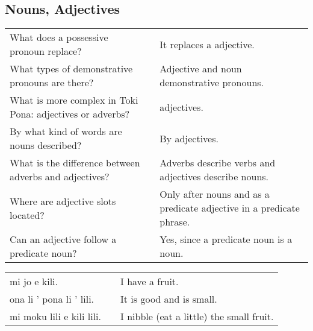 \newpage
%
\subsection*{Nouns, Adjectives}
\label{'adjectives'}
%
\begin{supertabular}{p{5,5cm}|ll}
    What does a possessive pronoun replace?                   &  & It replaces a adjective.                                             \\ %
    What types of demonstrative pronouns are there?           &  & Adjective and noun demonstrative pronouns.                           \\ %
    What is more complex in Toki Pona: adjectives or adverbs? &  & adjectives.                                                          \\ %
    By what kind of words are nouns described?                &  & By adjectives.                                                       \\ %
    What is the difference between adverbs and adjectives?    &  & Adverbs describe verbs and adjectives describe nouns.                \\ %
    Where are adjective slots located?                        &  & Only after nouns and as a predicate adjective in a predicate phrase. \\ %
    Can an adjective follow a predicate noun?                 &  & Yes, since a predicate noun is a noun.                               \\ %
\end{supertabular}

\begin{supertabular}{p{5,5cm}|ll}
    mi jo e kili.             &  & I have a fruit.                          \\
    ona li ' pona li ' lili.  &  & It is good and is small.                 \\
    mi moku lili e kili lili. &  & I nibble (eat a little) the small fruit. \\
\end{supertabular}

